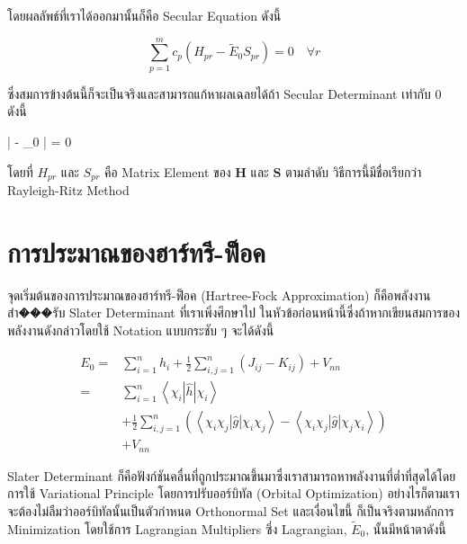 \noindent โดยผลลัพธ์ที่เราได้ออกมานั้นก็คือ Secular Equation ดังนี้

\begin{equation}
  \sum_{p=1}^{m} c_{p} \left( H_{pr} - \tilde{E}_{0} S_{pr} \right)
  =
  0 \quad \forall r
\end{equation}

\noindent ซึ่งสมการข้างต้นนี้ก็จะเป็นจริงและสามารถแก้หาผลเฉลยได้ถ้า Secular Determinant เท่ากับ 0 ดังนี้

\begin{tcolorbox}
  | - _{0} | = 0
\end{tcolorbox}

\noindent โดยที่ $H_{pr}$ และ $S_{pr}$ คือ Matrix Element ของ $\boldsymbol{H}$ และ $\boldsymbol{S}$ ตามลำดับ
วิธีการนี้มีชื่อเรียกว่า Rayleigh-Ritz Method

\section{การประมาณของฮาร์ทรี-ฟ็อค}

จุดเริ่มต้นของการประมาณของฮาร์ทรี-ฟ็อค (Hartree-Fock Approximation) ก็คือพลังงานสำ���รับ Slater Determinant ที่เราเพิ่งศึกษาไป%
ในหัวข้อก่อนหน้านี้ซึ่งถ้าหากเขียนสมการของพลังงานดังกล่าวโดยใช้ Notation แบบกระชับ ๆ จะได้ดังนี้

\begin{equation}
  \begin{aligned}
    \label{eq:energy_slater_determinant_compact}
    E_0
    = & \sum_{i=1}^n h_i
    + \frac{1}{2} \sum_{i, j=1}^n\left(J_{i j}-K_{i j}\right)
    + V_{n n}                                                              \\
    = & \sum_{i=1}^n\left\langle\chi_i|\hat{h}| \chi_i\right\rangle        \\
      & + \frac{1}{2} \sum_{i, j=1}^n
    \left(\left\langle\chi_i \chi_j|\hat{g}| \chi_i \chi_j\right\rangle
    - \left\langle\chi_i \chi_j|\hat{g}| \chi_j \chi_i\right\rangle\right) \\
      & + V_{n n}
  \end{aligned}
\end{equation}

Slater Determinant ก็คือฟังก์ชันคลื่นที่ถูกประมาณขึ้นมาซึ่งเราสามารถหาพลังงานที่ต่ำที่สุดได้โดยการใช้ Variational Principle
โดยการปรับออร์บิทัล (Orbital Optimization) อย่างไรก็ตามเราจะต้องไม่ลืมว่าออร์บิทัลนั้นเป็นตัวกำหนด Orthonormal Set และเงื่อนไขนี้%
ก็เป็นจริงตามหลักการ Minimization โดยใช้การ Lagrangian Multipliers ซึ่ง Lagrangian, $\tilde{E}_0$, นั้นมีหน้าตาดังนี้

